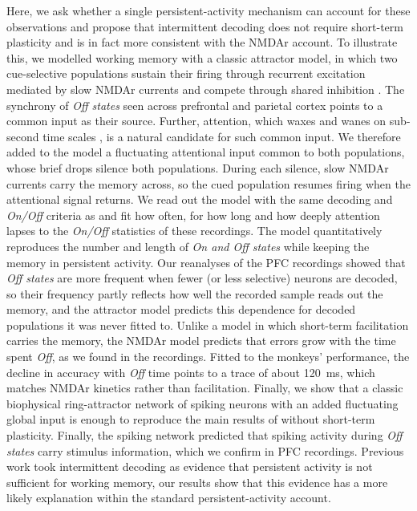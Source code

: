 \documentclass[11pt]{article}
\begin{document}
Here, we ask whether a single persistent-activity mechanism can account for these observations and propose that intermittent decoding does not require short-term plasticity and is in fact more consistent with the NMDAr account. To illustrate this, we modelled working memory with a classic attractor model, in which two cue-selective populations sustain their firing through recurrent excitation mediated by slow NMDAr currents and compete through shared inhibition \citep{wang2002,wong2006}. The synchrony of \emph{Off states} seen across prefrontal and parietal cortex \citep{mozumder2026} points to a common input as their source. Further, attention, which waxes and wanes on sub-second time scales \citep{fiebelkorn2019}, is a natural candidate for such common input. We therefore added to the model a fluctuating attentional input common to both populations, whose brief drops silence both populations. During each silence, slow NMDAr currents carry the memory across, so the cued population resumes firing when the attentional signal returns. We read out the model with the same decoding and \emph{On/Off} criteria as \citet{panichello2024} and fit how often, for how long and how deeply attention lapses to the \emph{On/Off} statistics of these recordings. The model quantitatively reproduces the number and length of \emph{On and Off states} while keeping the memory in persistent activity. Our reanalyses of the PFC recordings showed that \emph{Off states} are more frequent when fewer (or less selective) neurons are decoded, so their frequency partly reflects how well the recorded sample reads out the memory, and the attractor model predicts this dependence for decoded populations it was never fitted to. Unlike a model in which short-term facilitation carries the memory, the NMDAr model predicts that errors grow with the time spent \emph{Off}, as we found in the recordings. Fitted to the monkeys' performance, the decline in accuracy with \emph{Off} time points to a trace of about 120~ms, which matches NMDAr kinetics rather than facilitation. Finally, we show that a classic biophysical ring-attractor network of spiking neurons \citep{compte2000} with an added fluctuating global input is enough to reproduce the main results of \citet{panichello2024} without short-term plasticity. Finally, the spiking network predicted that spiking activity during \emph{Off states} carry stimulus information, which we confirm in PFC recordings. Previous work took intermittent decoding as evidence that persistent activity is not sufficient for working memory, our results show that this evidence has a more likely explanation within the standard persistent-activity account.
\end{document}
